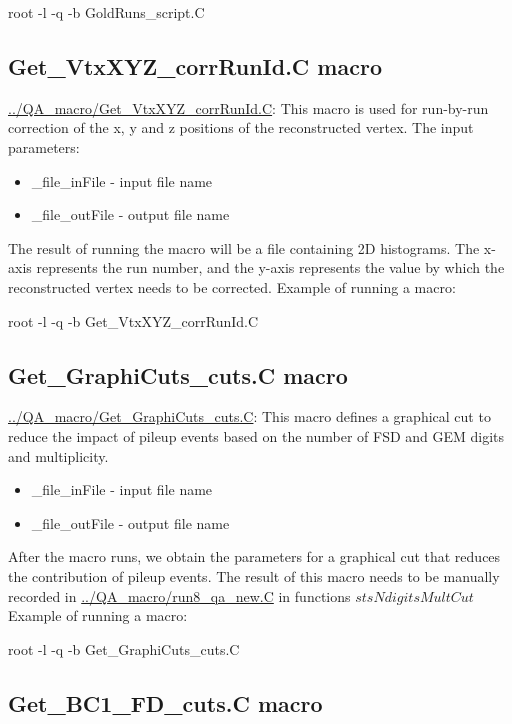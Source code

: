     root -l -q -b GoldRuns\_script.C

\subsection{Get\_VtxXYZ\_corrRunId.C macro}\label{corrVtx}

    \url{../QA_macro/Get_VtxXYZ_corrRunId.C}: This macro is used for run-by-run correction of the x, y and z positions of the reconstructed vertex.
    The input parameters:
    \begin{itemize}
        \item \_file\_inFile - input file name
        \item \_file\_outFile - output file name
    \end{itemize}
    The result of running the macro will be a file containing 2D histograms. 
    The x-axis represents the run number, and the y-axis represents the value by which the reconstructed vertex needs to be corrected.
    Example of running a macro:
    
    root -l -q -b Get\_VtxXYZ\_corrRunId.C


\subsection{Get\_GraphiCuts\_cuts.C macro}\label{GraphCut1}

    \url{../QA_macro/Get_GraphiCuts_cuts.C}: This macro defines a graphical cut to reduce the impact of pileup events based on the number of FSD and GEM digits and multiplicity.
    \begin{itemize}
        \item \_file\_inFile - input file name
        \item \_file\_outFile - output file name
    \end{itemize}
    After the macro runs, we obtain the parameters for a graphical cut that reduces the contribution of pileup events. The result of this macro needs to be manually recorded in \url{../QA_macro/run8_qa_new.C} in functions $stsNdigitsMultCut$
    Example of running a macro:
    
    root -l -q -b Get\_GraphiCuts\_cuts.C



\subsection{Get\_BC1\_FD\_cuts.C macro}\label{GraphCut2}

